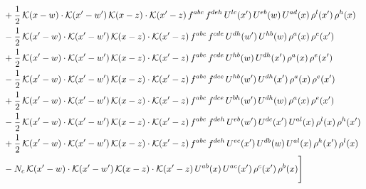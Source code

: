 \documentclass[9pt]{article}
\numberwithin{equation}{section}
\begin{document}
\begin{align}
& +\frac{1}{2}\,\mathcal{K}(x-w)\cdot\mathcal{K}(x'-w')\,\mathcal{K}(x-z)\cdot\mathcal{K}(x'-z)\,f^{abc}\,f^{deh}\,U^{lc}(x')\,U^{eb}(w)\,U^{ad}(x)\,\rho^{l}(x')\,\rho^{h}(x)\notag\\
& -\frac{1}{2}\,\mathcal{K}(x'-w)\cdot\mathcal{K}(x'-w')\,\mathcal{K}(x-z)\cdot\mathcal{K}(x'-z)\,f^{abc}\,f^{cde}\,U^{dh}(w')\,U^{hb}(w)\,\rho^{a}(x)\,\rho^{e}(x')\notag\\
& +\frac{1}{2}\,\mathcal{K}(x'-w)\cdot\mathcal{K}(x'-w')\,\mathcal{K}(x-z)\cdot\mathcal{K}(x'-z)\,f^{abc}\,f^{cde}\,U^{hb}(w)\,U^{dh}(x')\,\rho^{a}(x)\,\rho^{e}(x')\notag\\
& -\frac{1}{2}\,\mathcal{K}(x'-w)\cdot\mathcal{K}(x'-w')\,\mathcal{K}(x-z)\cdot\mathcal{K}(x'-z)\,f^{abc}\,f^{dce}\,U^{hb}(w')\,U^{dh}(x')\,\rho^{a}(x)\,\rho^{e}(x')\notag\\
& +\frac{1}{2}\,\mathcal{K}(x'-w)\cdot\mathcal{K}(x'-w')\,\mathcal{K}(x-z)\cdot\mathcal{K}(x'-z)\,f^{abc}\,f^{dce}\,U^{bh}(w')\,U^{dh}(w)\,\rho^{a}(x)\,\rho^{e}(x')\notag\\
& -\frac{1}{2}\,\mathcal{K}(x'-w)\cdot\mathcal{K}(x'-w')\,\mathcal{K}(x-z)\cdot\mathcal{K}(x'-z)\,f^{abc}\,f^{deh}\,U^{eb}(w')\,U^{dc}(x')\,U^{al}(x)\,\rho^{l}(x)\,\rho^{h}(x')\notag\\
& +\frac{1}{2}\,\mathcal{K}(x'-w)\cdot\mathcal{K}(x'-w')\,\mathcal{K}(x-z)\cdot\mathcal{K}(x'-z)\,f^{abc}\,f^{deh}\,U^{ec}(x')\,U^{db}(w)\,U^{al}(x)\,\rho^{h}(x')\,\rho^{l}(x)\notag\\
& -N_{c}\,\mathcal{K}(x'-w)\cdot\mathcal{K}(x'-w')\,\mathcal{K}(x-z)\cdot\mathcal{K}(x'-z)\,U^{ab}(x)\,U^{ac}(x')\,\rho^{c}(x')\,\rho^{b}(x)\Bigg]
\end{align}
\end{document}

